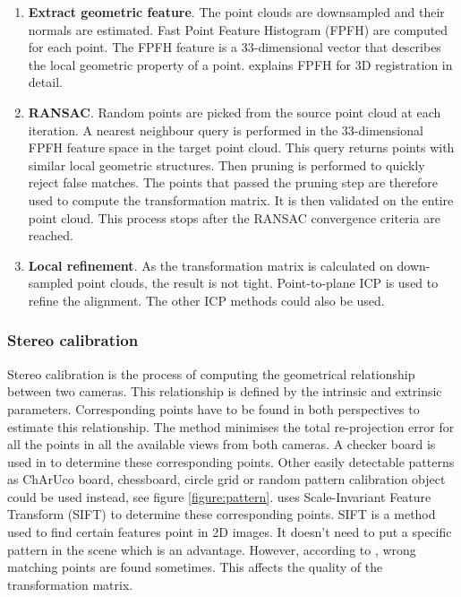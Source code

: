 \begin{enumerate}
    \item \textbf{Extract geometric feature}. The point clouds are downsampled and their normals are estimated. Fast Point Feature Histogram (FPFH) are computed for each point. The FPFH feature is a 33-dimensional vector that describes the local geometric property of a point. \cite{rusu_fast_2009} explains FPFH for 3D registration in detail.
    
    \item \textbf{RANSAC}. Random points are picked from the source point cloud at each iteration. A nearest neighbour query is performed in the 33-dimensional FPFH feature space in the target point cloud. This query returns points with similar local geometric structures. Then pruning is performed to quickly reject false matches. The points that passed the pruning step are therefore used to compute the transformation matrix. It is then validated on the entire point cloud. This process stops after the RANSAC convergence criteria are reached.
    
    \item \textbf{Local refinement}. As the transformation matrix is calculated on down-sampled point clouds, the result is not tight. Point-to-plane ICP is used to refine the alignment. The other ICP methods could also be used.
\end{enumerate}


\subsubsection{Stereo calibration}

Stereo calibration is the process of computing the geometrical relationship between two cameras. This relationship is defined by the intrinsic and extrinsic parameters. Corresponding points have to be found in both perspectives to estimate this relationship. The method minimises the total re-projection error for all the points in all the available views from both cameras. A checker board is used in \cite{rathnayaka_efficient_2017} to determine these corresponding points. Other easily detectable patterns as ChArUco board, chessboard, circle grid or random pattern calibration object could be used instead, see figure \ref{figure:pattern}. \cite{liu_stereo_2009} uses Scale-Invariant Feature Transform (SIFT) to determine these corresponding points. SIFT is a method used to find certain features point in 2D images. It doesn't need to put a specific pattern in the scene which is an advantage. However, according to \cite{liu_stereo_2009}, wrong matching points are found sometimes. This affects the quality of the transformation matrix.


